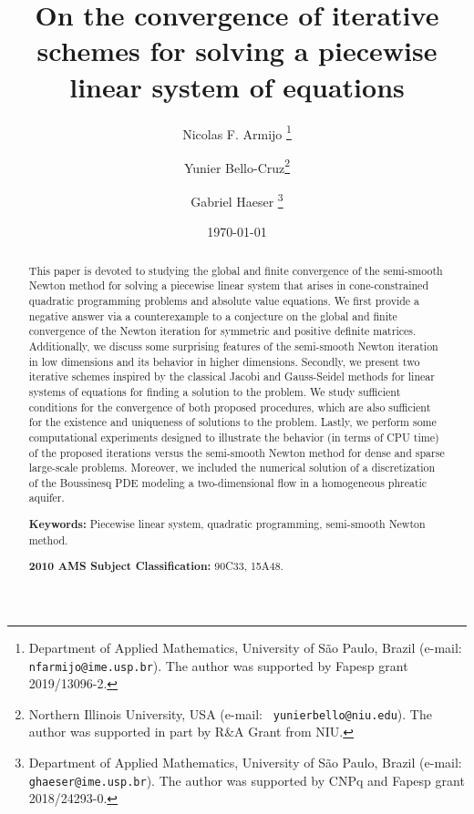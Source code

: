 \documentclass[11pt]{article}
\begin{document}
\title{On the convergence of iterative schemes for solving a piecewise linear system of equations}

\author{Nicolas F. Armijo \thanks{Department of Applied Mathematics, University of São Paulo, Brazil (e-mail: {\tt
nfarmijo@ime.usp.br}).  The author was supported by Fapesp grant 2019/13096-2.}  
\and
Yunier  Bello-Cruz\thanks{Northern Illinois University, USA (e-mail: {\tt
yunierbello@niu.edu}).  The author was supported in part by R\&A Grant from NIU.}
\and
Gabriel Haeser \thanks{Department of Applied Mathematics, University of São Paulo, Brazil (e-mail: {\tt
ghaeser@ime.usp.br}). The author was supported by CNPq and Fapesp grant 2018/24293-0.}
}
\date{\today}

\maketitle


\begin{abstract}
\noindent This paper is devoted to studying the global and finite convergence of the semi-smooth Newton method for solving a piecewise linear system that arises in cone-constrained quadratic programming problems and absolute value equations. We first provide a negative answer via a counterexample to a conjecture on the global and finite convergence of the Newton iteration for symmetric and positive definite matrices. Additionally, we discuss some surprising features of the semi-smooth Newton iteration in low dimensions and its behavior in higher dimensions. Secondly, we present two iterative schemes inspired by the classical Jacobi and Gauss-Seidel methods for linear systems of equations for finding a solution to the problem. We study sufficient conditions for the convergence of both proposed procedures, which are also sufficient for the existence and uniqueness of solutions to the problem. Lastly, we perform some computational experiments designed to illustrate the behavior (in terms of CPU time) of the proposed iterations versus the semi-smooth Newton method for dense and sparse large-scale problems. Moreover, we included the numerical solution of a discretization of the Boussinesq PDE modeling a two-dimensional flow in a homogeneous phreatic aquifer. 

\medskip

\noindent
{\bf Keywords:} Piecewise linear system, quadratic programming,   semi-smooth Newton method.

\medskip
\noindent
 {\bf  2010 AMS Subject Classification:} 90C33, 15A48.

\end{abstract}
\end{document}
